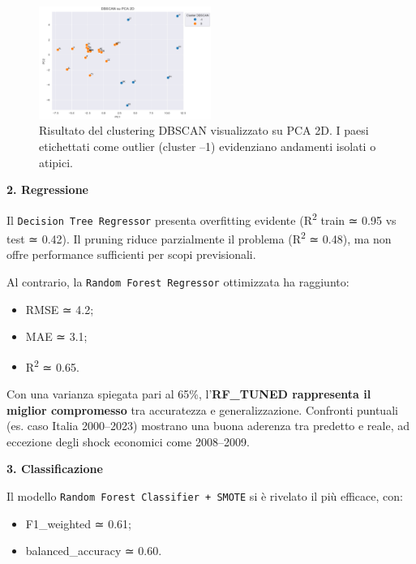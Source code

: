\documentclass[conference]{IEEEtran}
\begin{document}
\begin{figure}[H]
\centering
\includegraphics[width=0.5\textwidth]{images/DBSCAN}
\caption{Risultato del clustering DBSCAN visualizzato su PCA 2D. I paesi etichettati come outlier (cluster –1) evidenziano andamenti isolati o atipici.}
\label{fig:dbscan-pca}
\end{figure}

\vspace{1em}\noindent\textbf{2. Regressione}

Il \texttt{Decision Tree Regressor} presenta overfitting evidente (R\textsuperscript{2} train ≃ 0.95 vs test ≃ 0.42). Il pruning riduce parzialmente il problema (R\textsuperscript{2} ≃ 0.48), ma non offre performance sufficienti per scopi previsionali.

Al contrario, la \texttt{Random Forest Regressor} ottimizzata ha raggiunto:

\begin{itemize}
  \item RMSE ≃ 4.2;
  \item MAE ≃ 3.1;
  \item R\textsuperscript{2} ≃ 0.65.
\end{itemize}

Con una varianza spiegata pari al 65\%, l’\textbf{RF\_TUNED rappresenta il miglior compromesso} tra accuratezza e generalizzazione. Confronti puntuali (es. caso Italia 2000–2023) mostrano una buona aderenza tra predetto e reale, ad eccezione degli shock economici come 2008–2009.

\vspace{1em}\noindent\textbf{3. Classificazione}

Il modello \texttt{Random Forest Classifier + SMOTE} si è rivelato il più efficace, con:

\begin{itemize}
  \item F1\_weighted ≃ 0.61;
  \item balanced\_accuracy ≃ 0.60.
\end{itemize}
\end{document}
